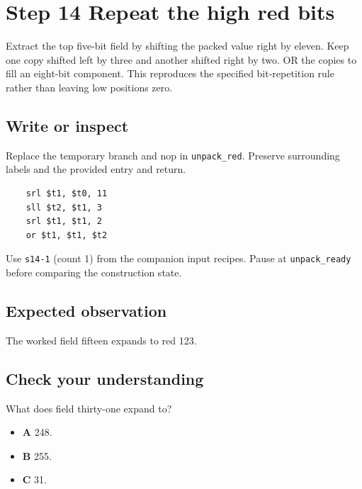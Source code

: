\section{Step 14 Repeat the high red bits}\label{rgb-s14}

Extract the top five-bit field by shifting the packed value right by eleven. Keep one copy shifted left by three and another shifted right by two. OR the copies to fill an eight-bit component. This reproduces the specified bit-repetition rule rather than leaving low positions zero.

\subsection{Write or inspect}
Replace the temporary branch and nop in \texttt{unpack\_red}. Preserve surrounding labels and the provided entry and return.

\begin{verbatim}
    srl $t1, $t0, 11
    sll $t2, $t1, 3
    srl $t1, $t1, 2
    or $t1, $t1, $t2
\end{verbatim}
Use \texttt{s14-1} (count 1) from the companion input recipes. Pause at \texttt{unpack\_ready} before comparing the construction state.

\subsection{Expected observation}
The worked field fifteen expands to red 123.

\subsection{Check your understanding}
What does field thirty-one expand to?

\begin{itemize}
  \item \textbf{A} 248.
  \item \textbf{B} 255.
  \item \textbf{C} 31.
\end{itemize}
